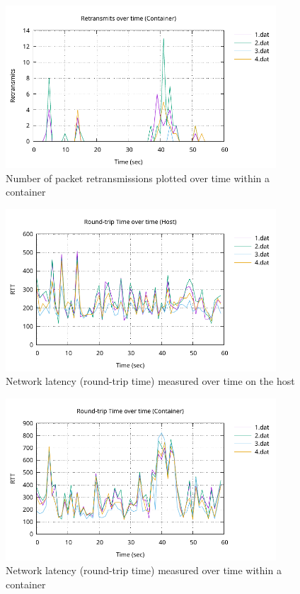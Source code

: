 \begin{figure}[H]
    \centering
    \includegraphics[width=0.9\textwidth]{images/results/network-retransmits-container.pdf}
    \caption{Number of packet retransmissions plotted over time within a container}
    \label{images:experiment/network-retransmits-container.pdf}
\end{figure}

\begin{figure}[H]
    \centering
    \includegraphics[width=0.9\textwidth]{images/results/network-host-rtt.pdf}
    \caption{Network latency (round-trip time) measured over time on the host}
    \label{images:experiment/network-host-rtt.pdf}
\end{figure}

\begin{figure}[H]
    \centering
    \includegraphics[width=0.9\textwidth]{images/results/network-rtt-container.pdf}
    \caption{Network latency (round-trip time) measured over time within a container}
    \label{images:experiment/network-rtt-container.pdf}
\end{figure}

